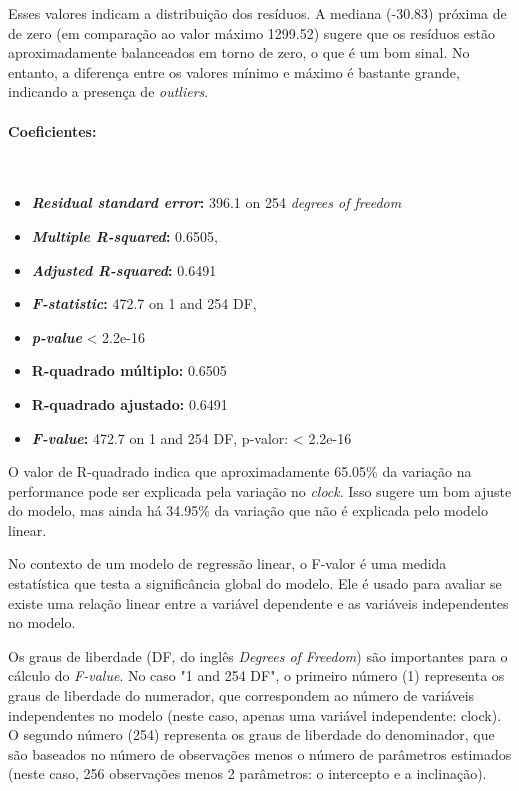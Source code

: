 \documentclass[article]{memoir}
\begin{document}
{Esses valores indicam a distribuição dos resíduos. A mediana (-30.83) próxima de de zero (em comparação ao valor máximo 1299.52)   sugere que os resíduos estão aproximadamente balanceados em torno de zero, o que é um bom sinal. No entanto, a diferença entre os valores mínimo e máximo é bastante grande, indicando a presença de \textit{outliers}.

\paragraph*{Coeficientes:}\mbox{}\\
\begin{itemize}
	\item \textbf{\textit{Residual standard error}:} 396.1 on 254 \textit{degrees of freedom}
	\item \textbf{\textit{Multiple R-squared}:}	0.6505,
	\item \textbf{\textit{Adjusted R-squared}:} 0.6491
	\item \textbf{\textit{F-statistic}:} 472.7 on 1 and 254 DF,
	\item \textbf{\textit{p-value}} < 2.2e-16
	\item \textbf{R-quadrado múltiplo:} 0.6505
	\item \textbf{R-quadrado ajustado:} 0.6491
	\item \textbf{\textit{F-value}:} 472.7 on 1 and 254 DF, p-valor: < 2.2e-16
\end{itemize}



O valor de R-quadrado indica que aproximadamente 65.05\% da variação na performance pode ser explicada pela variação no \textit{clock}. Isso sugere um bom ajuste do modelo, mas ainda há 34.95\% da variação que não é explicada pelo modelo linear.


	
	No contexto de um modelo de regressão linear, o F-valor é uma medida estatística que testa a significância global do modelo. Ele é usado para avaliar se existe uma relação linear entre a variável dependente e as variáveis independentes no modelo.
	
	Os graus de liberdade (DF, do inglês \textit{Degrees of Freedom}) são importantes para o cálculo do \textit{F-value}. No caso "1 and 254 DF", o primeiro número (1) representa os graus de liberdade do numerador, que correspondem ao número de variáveis independentes no modelo (neste caso, apenas uma variável independente: clock). O segundo número (254) representa os graus de liberdade do denominador, que são baseados no número de observações menos o número de parâmetros estimados (neste caso, 256 observações menos 2 parâmetros: o intercepto e a inclinação).
	

}
\end{document}
